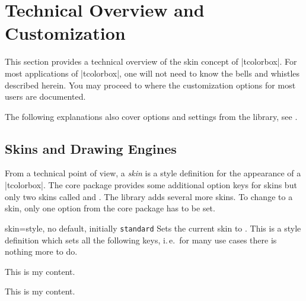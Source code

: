 \clearpage
\section{Technical Overview and Customization}\label{sec:technical}%
%
This section provides a technical overview of the skin concept of |tcolorbox|.
For most applications of |tcolorbox|, one will not need to know the bells and
whistles described herein.
You may proceed to  where the customization options
for most users are documented.

The following explanations also cover options and settings from the  library,
see  .



\subsection{Skins and Drawing Engines}\label{sec:skincorekeys}
From a technical point of view, a \emph{skin} is a style definition for the
appearance of a |tcolorbox|. The core package provides some additional
option keys for skins but only two skins called 
and .
The  library adds several more skins. To change to a skin, only one
option from the core package has to be set.

\begin{docTcbKey}{skin}{=}{style, no default, initially \texttt{standard}}
  Sets the current skin to . This is a style definition which sets all the following
  keys, i.\,e.\ for many use cases there is nothing more to do.
\begin{dispExample}

\begin{tcolorbox}[adjusted title=My title]
  This is my content.
\end{tcolorbox}
\begin{tcolorbox}[skin=beamer,beamer,adjusted title=My title]
  This is my content.
\end{tcolorbox}
\end{dispExample}
\end{docTcbKey}


